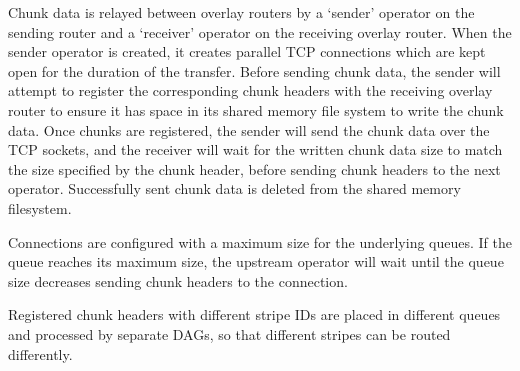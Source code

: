 Chunk data is relayed between overlay routers by a `sender' operator on the sending router and a `receiver' operator on the receiving overlay router.
When the sender operator is created, it creates parallel TCP connections 
which are kept open for the duration of the transfer. 
Before sending chunk data, the sender will attempt to register the corresponding chunk headers with the receiving overlay router to ensure it has space in its shared memory file system to write the chunk data. Once chunks are registered, the sender will send the chunk data over the TCP sockets, and the receiver will wait for the written chunk data size to match the size specified by the chunk header, before sending chunk headers to the next operator. Successfully sent chunk data is deleted from the shared memory filesystem. 

  Connections are configured with a maximum size for the underlying queues. If the queue reaches its maximum size, the upstream operator will wait until the queue size decreases sending chunk headers to the connection.

 Registered chunk headers with different stripe IDs are placed in different queues and processed by separate DAGs, so that different stripes can be routed differently.






